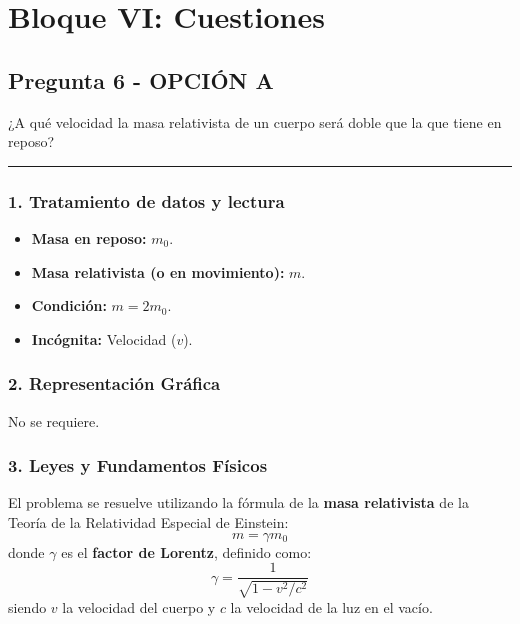 \newpage

\section{Bloque VI: Cuestiones}
\label{sec:moderna2_2008_sep_ext}

\subsection{Pregunta 6 - OPCIÓN A}
\label{subsec:6A_2008_sep_ext}

\begin{cajaenunciado}
¿A qué velocidad la masa relativista de un cuerpo será doble que la que tiene en reposo?
\end{cajaenunciado}
\hrule

\subsubsection*{1. Tratamiento de datos y lectura}
\begin{itemize}
    \item \textbf{Masa en reposo:} $m_0$.
    \item \textbf{Masa relativista (o en movimiento):} $m$.
    \item \textbf{Condición:} $m = 2m_0$.
    \item \textbf{Incógnita:} Velocidad ($v$).
\end{itemize}

\subsubsection*{2. Representación Gráfica}
No se requiere.

\subsubsection*{3. Leyes y Fundamentos Físicos}
El problema se resuelve utilizando la fórmula de la \textbf{masa relativista} de la Teoría de la Relatividad Especial de Einstein:
$$ m = \gamma m_0 $$
donde $\gamma$ es el \textbf{factor de Lorentz}, definido como:
$$ \gamma = \frac{1}{\sqrt{1 - v^2/c^2}} $$
siendo $v$ la velocidad del cuerpo y $c$ la velocidad de la luz en el vacío.

